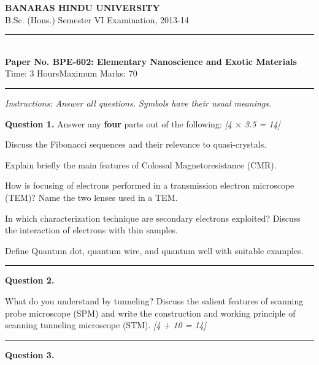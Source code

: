 \documentclass[11pt,a4paper]{article}
\newcommand{\pts}[1]{\hfill   \textit{[#1]}}
\begin{document}
\begin{center}
  {\large\bfseries BANARAS HINDU UNIVERSITY}\\[2pt]
  {\normalsize B.Sc. (Hons.) Semester VI Examination, 2013-14}\\[6pt]
  \rule{0.8\linewidth}{0.5pt}\\[6pt]
  {\large\bfseries Paper No. BPE-602: Elementary Nanoscience and Exotic Materials}\\[4pt]
  {\normalsize Time: 3 Hours\hfill Maximum Marks: 70}
\end{center}
\rule{\linewidth}{0.4pt}
\smallskip



\noindent   \textit{Instructions: Answer all questions. Symbols have their usual meanings.}
\bigskip




\noindent   \textbf{Question 1.} Answer any   \textbf{four} parts out of the following: \pts{4 $ \times$ 3.5 = 14}

\begin{parts}
  \item Discuss the Fibonacci sequences and their relevance to quasi-crystals.
  \item Explain briefly the main features of Colossal Magnetoresistance (CMR).
  \item How is focusing of electrons performed in a transmission electron microscope (TEM)? Name the two lenses used in a TEM.
  \item In which characterization technique are secondary electrons exploited? Discuss the interaction of electrons with thin samples.
  \item Define Quantum dot, quantum wire, and quantum well with suitable examples.
\end{parts}

\medskip\rule{\linewidth}{0.2pt}




\noindent   \textbf{Question 2.}

\begin{parts}
  \item What do you understand by tunneling? Discuss the salient features of scanning probe microscope (SPM) and write the construction and working principle of scanning tunneling microscope (STM). \pts{4 + 10 = 14}
\end{parts}

\medskip\rule{\linewidth}{0.2pt}




\noindent   \textbf{Question 3.}
\end{document}
